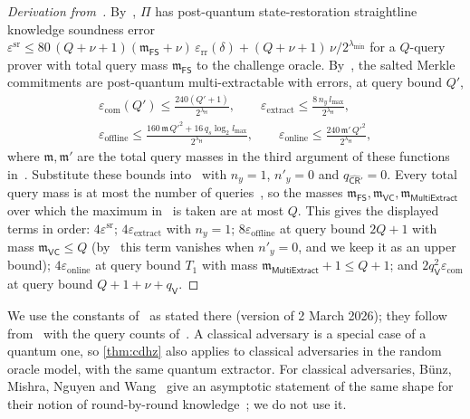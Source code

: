 \begin{proof}[Derivation from~\cite{CDHZ25}]
By~\cite[Theorem~6.10]{CDHZ25}, $\Pi$ has post-quantum state-restoration straightline knowledge soundness error $\varepsilon^{\mathrm{sr}} \le 80\,(Q+\nu+1)(\mathfrak{m}_{\mathsf{FS}}+\nu)\,\varepsilon_{\mathrm{rr}}(\delta) + (Q+\nu+1)\,\nu/2^{\lambda_{\min}}$ for a $Q$-query prover with total query mass $\mathfrak{m}_{\mathsf{FS}}$ to the challenge oracle.
By~\cite[Theorem~8.3]{CDHZ25}, the salted Merkle commitments are post-quantum multi-extractable with errors, at query bound $Q'$,
\begin{gather*}
  \varepsilon_{\mathrm{com}}(Q') \le \frac{240(Q'+1)}{2^{\lambda_{\mathsf{H}}}}, \qquad \varepsilon_{\mathrm{extract}} \le \frac{8\,n_y\,l_{\max}}{2^{\lambda_{\mathsf{H}}}}, \\
  \varepsilon_{\mathrm{offline}} \le \frac{160\, \mathfrak{m}\, Q'^2 + 16\, q_s \log_2 l_{\max}}{2^{\lambda_{\mathsf{H}}}}, \qquad \varepsilon_{\mathrm{online}} \le \frac{240\, \mathfrak{m}'\, Q'^2}{2^{\lambda_{\mathsf{H}}}},
\end{gather*}
where $\mathfrak{m}, \mathfrak{m}'$ are the total query masses in the third argument of these functions in~\cite{CDHZ25}.
Substitute these bounds into~\cite[Theorem~11.3]{CDHZ25} with $n_y = 1$, $n'_y = 0$ and $q_{\widehat{\mathsf{CR}}'} = 0$.
Every total query mass is at most the number of queries~\cite[Definition~4.3 and Remark~4.2]{CDHZ25}, so the masses $\mathfrak{m}_{\mathsf{FS}}, \mathfrak{m}_{\mathsf{VC}}, \mathfrak{m}_{\mathsf{MultiExtract}}$ over which the maximum in~\cite[Theorem~11.3]{CDHZ25} is taken are at most $Q$.
This gives the displayed terms in order: $4\varepsilon^{\mathrm{sr}}$; $4\varepsilon_{\mathrm{extract}}$ with $n_y = 1$; $8\varepsilon_{\mathrm{offline}}$ at query bound $2Q+1$ with mass $\mathfrak{m}_{\mathsf{VC}} \le Q$ (by~\cite[Remark~11.5]{CDHZ25} this term vanishes when $n'_y = 0$, and we keep it as an upper bound); $4\varepsilon_{\mathrm{online}}$ at query bound $T_1$ with mass $\mathfrak{m}_{\mathsf{MultiExtract}} + 1 \le Q+1$; and $2 q_{\mathsf{V}}^2 \varepsilon_{\mathrm{com}}$ at query bound $Q+1+\nu+q_{\mathsf{V}}$.
\end{proof}

We use the constants of~\cite[Theorem~8.3]{CDHZ25} as stated there (version of 2 March 2026); they follow from~\cite[Theorem~8.4, Lemmas~8.7 and~8.8]{CDHZ25} with the query counts of~\cite[\S8.3]{CDHZ25}.
A classical adversary is a special case of a quantum one, so \cref{thm:cdhz} also applies to classical adversaries in the random oracle model, with the same quantum extractor.
For classical adversaries, B\"unz, Mishra, Nguyen and Wang~\cite[Theorem~5.9]{BMNW24} give an asymptotic statement of the same shape for their notion of round-by-round knowledge~\cite[Definition~5.5]{BMNW24}; we do not use it.
